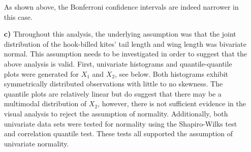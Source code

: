 \begin{enumerate}
	As shown above, the Bonferroni confidence intervals are indeed narrower in this case.
	
	\item[\bf{c)}] Throughout this analysis, the underlying assumption was that the joint distribution of the hook-billed kites' tail length and wing length was bivariate normal. This assumption needs to be investigated in order to suggest that the above analysis is valid. First, univariate histograms and quantile-quantile plots were generated for $X_1$ and $X_2$, see below. Both histograms exhibit symmetrically distributed observations with little to no skewness. The quantile plots are relatively linear but do suggest that there may be a multimodal distribution of $X_2$, however, there is not sufficient evidence in the visual analysis to reject the assumption of normality. Additionally, both univariate data sets were tested for normality using the Shapiro-Wilks test and correlation quantile test. These tests all supported the assumption of univariate normality. 


\end{enumerate}
